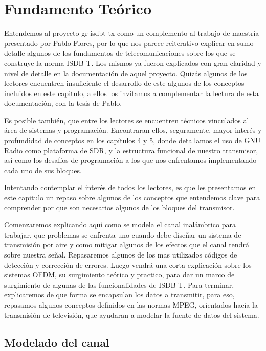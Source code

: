 \chapter{Fundamento Teórico}

Entendemos al proyecto gr-isdbt-tx como un complemento al trabajo de maestría presentado por Pablo Flores, por lo que nos parece reiterativo explicar en sumo detalle algunos de los fundamentos de telecomunicaciones sobre los que se construye la norma ISDB-T. Los mismos ya fueron explicados con gran claridad y nivel de detalle en la documentación de aquel proyecto. Quizás algunos de los lectores encuentren insuficiente el desarrollo de este algunos de los conceptos incluidos en este capitulo, a ellos los invitamos a complementar la lectura de esta documentación, con la tesis de Pablo.

Es posible también, que entre los lectores se encuentren técnicos vinculados al área de sistemas y programación.  Encontraran ellos, seguramente, mayor interés y profundidad de conceptos en los capítulos 4 y 5, donde detallamos el uso de GNU Radio como plataforma de SDR, y la estructura funcional de nuestro transmisor, así como los desafíos de programación a los que nos enfrentamos implementando cada uno de sus bloques. 

Intentando contemplar el interés de todos los lectores, es que les presentamos en este capitulo un repaso sobre algunos de los conceptos que entendemos clave para comprender por que son necesarios algunos de los bloques del transmisor. 

Comenzaremos explicando aquí como se modela el canal inalámbrico para trabajar, que problemas se enfrenta uno cuando debe diseñar un sistema de transmisión por aire y como mitigar algunos de los efectos que el canal tendrá sobre nuestra señal. Repasaremos algunos de los mas utilizados códigos de detección y corrección de errores. Luego vendrá una corta explicación sobre los sistemas OFDM, su surgimiento teórico y practico, para dar un marco de surgimiento de algunas de las funcionalidades de ISDB-T. Para terminar, explicaremos de que forma se encapsulan los datos a transmitir, para eso, repasamos algunos conceptos definidos en las normas MPEG, orientados hacia la transmisión de televisión, que ayudaran a modelar la fuente de datos del sistema.  

\section{Modelado del canal}

